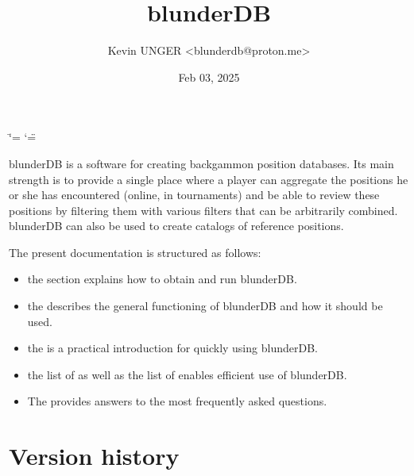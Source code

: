 \documentclass[letterpaper,10pt,english]{sphinxmanual}
\title{blunderDB}
\date{Feb 03, 2025}
\author{Kevin UNGER \textless{}blunderdb@proton.me\textgreater{}}
\begin{document}
\ifdefined\shorthandoff
  \ifnum\catcode`\=\string=\active\shorthandoff{=}\fi
  \ifnum\catcode`\"=\active{}\fi
\fi

\pagestyle{empty}
\sphinxmaketitle
\pagestyle{plain}
\sphinxtableofcontents
\pagestyle{normal}
\label{\detokenize{index::doc}}


\sphinxAtStartPar
blunderDB is a software for creating backgammon position databases. Its main strength is to provide a single place where a player can aggregate the positions he or she has encountered (online, in tournaments) and be able to review these positions by filtering them with various filters that can be arbitrarily combined. blunderDB can also be used to create catalogs of reference positions.

\sphinxAtStartPar
The present documentation is structured as follows:
\begin{itemize}
\item {} 
\sphinxAtStartPar
the  section explains how to obtain and run blunderDB.

\item {} 
\sphinxAtStartPar
the  describes the general functioning of blunderDB and how it should be used.

\item {} 
\sphinxAtStartPar
the  is a practical introduction for quickly using blunderDB.

\item {} 
\sphinxAtStartPar
the list of  as well as the list of  enables efficient use of blunderDB.

\item {} 
\sphinxAtStartPar
The  provides answers to the most frequently asked questions.

\end{itemize}


\chapter{Version history}
\label{\detokenize{index:historique-des-versions}}
\end{document}
